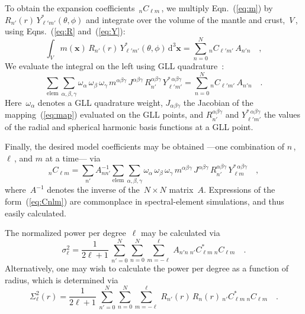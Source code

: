 \documentclass[extra,mreferee]{gji}
\begin{document}
To obtain the expansion coefficients~${}_nC_{\ell m}$\,, we multiply Eqn.~(\ref{eq:m}) by
$R_{n'}(r)\,Y^*_{\ell' m'}(\theta,\phi)$ and integrate over the volume of the mantle and crust,~$V$\,, using Eqns.~(\ref{eq:R} and~(\ref{eq:Y}):
\begin{equation}
    \int_V m(\mathbf{x})\,R_{n'}(r)\,Y^*_{\ell' m'}(\theta,\phi)\,\mathrm{d}^3\mathbf{x}=\sum_{n=0}^N {}_nC_{\ell' m'}\,A_{n'n}
    \quad ,
\end{equation}
We evaluate the integral on the left using GLL quadrature~\citep{KoTr99}:
\begin{equation}
    \sum_{\mathrm{elem}}\sum_{\alpha,\beta,\gamma}\omega_\alpha\,\omega_\beta\,\omega_\gamma\,m^{\alpha\beta\gamma}\,J^{\alpha\beta\gamma}\,R_{n'}^{\alpha\beta\gamma}\,Y_{\ell'm'}^{*\,\alpha\beta\gamma}
    =\sum_{n=0}^N {}_nC_{\ell' m'}\,A_{n'n}
    \quad .
\end{equation}
Here~$\omega_\alpha$ denotes a GLL quadrature weight,
$J_{\alpha\beta\gamma}$ the Jacobian of the mapping~(\ref{eq:map}) evaluated on the GLL points,
and $R_{n'}^{\alpha\beta\gamma}$ and $Y_{\ell'm'}^{*\,\alpha\beta\gamma}$ the values of the radial and spherical harmonic basis functions at a GLL point.

Finally, the desired model coefficients may be obtained ---one combination of $n$\,, $\ell$\,, and $m$ at a time--- via
\begin{equation}
    {}_nC_{\ell m}=\sum_{n'}A^{-1}_{nn'}\sum_{\mathrm{elem}}\sum_{\alpha,\beta,\gamma}\omega_\alpha\,\omega_\beta\,\omega_\gamma\,m^{\alpha\beta\gamma}\,J^{\alpha\beta\gamma}\,R_{n'}^{\alpha\beta\gamma}\,Y_{\ell m}^{*\,\alpha\beta\gamma}
    \quad ,
    \label{eq:Cnlm}
\end{equation}
where~$A^{-1}$ denotes the inverse of the~$N\times N$ matrix~$A$.
Expressions of the form~(\ref{eq:Cnlm}) are commonplace in spectral-element simulations,
and thus easily calculated.

The normalized power per degree~$\ell$ may be calculated via
\begin{equation}
    \sigma_\ell^2=\frac{1}{2\ell+1}\,
    \sum_{n' = 0}^N\sum_{n = 0}^N\sum_{m = -\ell}^\ell\,A_{n'n}\,{}_{n'}C^*_{\ell m}\,{}_{n}C_{\ell m}
    \quad .
\end{equation}
Alternatively,
one may wish to calculate the power per degree as a function of radius,
which is determined via
\begin{equation}
    \Sigma_\ell^2(r)=\frac{1}{2\ell+1}\,
    \sum_{n' = 0}^N\sum_{n = 0}^N\sum_{m = -\ell}^\ell\,R_{n'}(r)\,R_{n}(r)\,{}_{n'}C^*_{\ell m}\,{}_{n}C_{\ell m}
    \quad .
\end{equation}
\end{document}
